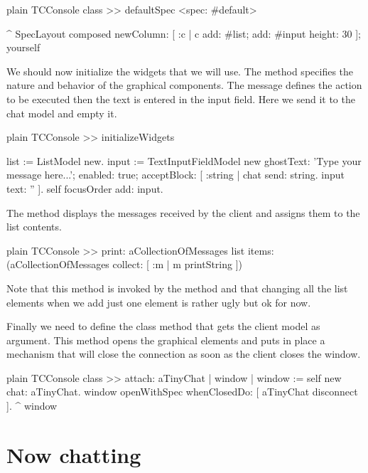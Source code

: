 \documentclass[10pt,twoside,english]{_support/latex/sbabook/sbabook}
\begin{document}
\begin{displaycode}{plain}
TCConsole class >> defaultSpec
	<spec: #default>

	^ SpecLayout composed
		newColumn: [ :c | 
			c add: #list; add: #input height: 30 ]; yourself
\end{displaycode}

We should now initialize the widgets that we will use.
The method  specifies the nature and behavior of the graphical components. 
The message  defines the action to be executed then the text is entered in the input field.
Here we send it to the chat model and empty it.

\begin{displaycode}{plain}
TCConsole >> initializeWidgets

	list := ListModel new.
	input := TextInputFieldModel new 
		ghostText: 'Type your message here...';
		enabled: true;
		acceptBlock: [ :string |  
			chat send: string. 
			input text: '' ].
	self focusOrder add: input.
\end{displaycode}

The method  displays the messages received by the client and assigns them to the list contents.

\begin{displaycode}{plain}
TCConsole >> print: aCollectionOfMessages
	list items: (aCollectionOfMessages collect: [  :m |  m printString ])
\end{displaycode}

Note that this method is invoked by the method  and that changing all the list elements when we add just one element is rather ugly but ok for now.

Finally we need to define the class method  that gets the client model as argument.
This method opens the graphical elements and puts in place a mechanism that will close the connection as soon as the client closes the window.
 

\begin{displaycode}{plain}
TCConsole class >> attach: aTinyChat
	| window |
	window := self new chat: aTinyChat.
	window openWithSpec whenClosedDo: [ aTinyChat disconnect ].
	^ window
\end{displaycode}
\section{Now chatting}
\end{document}
